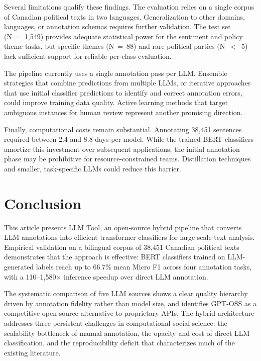 \documentclass[12pt]{article}
\begin{document}
Several limitations qualify these findings. The evaluation relies on a single corpus of Canadian political texts in two languages. Generalization to other domains, languages, or annotation schemas requires further validation. The test set (N~=~1,549) provides adequate statistical power for the sentiment and policy theme tasks, but specific themes (N~=~88) and rare political parties (N~$<$~5) lack sufficient support for reliable per-class evaluation.

The pipeline currently uses a single annotation pass per LLM. Ensemble strategies that combine predictions from multiple LLMs, or iterative approaches that use initial classifier predictions to identify and correct annotation errors, could improve training data quality. Active learning methods that target ambiguous instances for human review represent another promising direction.

Finally, computational costs remain substantial. Annotating 38,451 sentences required between 2.4 and 8.8 days per model. While the trained BERT classifiers amortize this investment over subsequent applications, the initial annotation phase may be prohibitive for resource-constrained teams. Distillation techniques and smaller, task-specific LLMs could reduce this barrier.

\section{Conclusion}

This article presents LLM Tool, an open-source hybrid pipeline that converts LLM annotations into efficient transformer classifiers for large-scale text analysis. Empirical validation on a bilingual corpus of 38,451 Canadian political texts demonstrates that the approach is effective: BERT classifiers trained on LLM-generated labels reach up to 66.7\% mean Micro F1 across four annotation tasks, with a 110--1,580$\times$ inference speedup over direct LLM annotation.

The systematic comparison of five LLM sources shows a clear quality hierarchy driven by annotation fidelity rather than model size, and identifies GPT-OSS as a competitive open-source alternative to proprietary APIs. The hybrid architecture addresses three persistent challenges in computational social science: the scalability bottleneck of manual annotation, the opacity and cost of direct LLM classification, and the reproducibility deficit that characterizes much of the existing literature.
\end{document}
